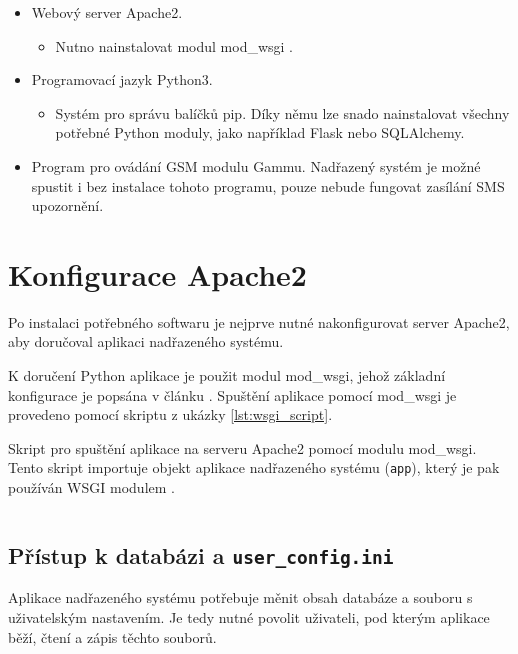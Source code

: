\begin{itemize}
    \item Webový server Apache2.
    \begin{itemize}
        \item Nutno nainstalovat modul mod\_wsgi  \cite{mod_wsgi}.
    \end{itemize}
    \item Programovací jazyk Python3.
    \begin{itemize}
        \item Systém pro správu balíčků pip. Díky němu lze snado nainstalovat všechny potřebné Python moduly, jako například Flask nebo SQLAlchemy.
    \end{itemize}
    \item Program pro ovádání GSM modulu Gammu. Nadřazený systém je možné spustit i bez instalace tohoto programu, pouze nebude fungovat zasílání SMS upozornění.
\end{itemize}

\newpage

\section{Konfigurace Apache2}

Po instalaci potřebného softwaru je nejprve nutné nakonfigurovat server Apache2, aby doručoval aplikaci nadřazeného systému. 

K doručení Python aplikace je použit modul mod\_wsgi, jehož základní konfigurace je popsána v článku \cite{flask_wsgi}. Spuštění aplikace pomocí mod\_wsgi je provedeno pomocí skriptu z ukázky \ref{lst:wsgi_script}.

\begin{listing}[htbp]
\caption{\label{lst:wsgi_script} Skript pro spuštění aplikace na serveru Apache2 pomocí modulu mod\_wsgi. Tento skript importuje objekt aplikace nadřazeného systému (\texttt{app}), který je pak používán WSGI modulem \cite{flask_wsgi}.}
\inputminted[bgcolor=codebg]{python}{source-samples/wsgi.py}
\end{listing}

\newpage

\subsection{Přístup k databázi a \texttt{user\_config.ini}}

Aplikace nadřazeného systému potřebuje měnit obsah databáze a souboru s uživatelským nastavením. Je tedy nutné povolit uživateli, pod kterým aplikace běží, čtení a zápis těchto souborů. 


